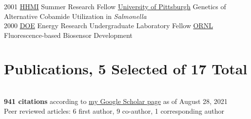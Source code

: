 \documentclass[letterpaper]{twentysecondcv3} %
\begin{document}
\begin{twenty}
    \twentyitem
   	{2001}
		{}
        {\href{https://www.hhmi.org/}{HHMI} Summer Research Fellow}
        {\href{https://www.pitt.edu/}{University of Pittsburgh}}
        {Genetics of Alternative Cobamide Utilization in \textit{Salmonella}}\\

    \twentyitem
        {2000}
		{}
        {\href{https://www.energy.gov/}{DOE} Energy Research Undergraduate Laboratory Fellow}
        {\href{https://www.ornl.gov/}{ORNL}}
        {Fluorescence-based Biosensor Development}

\end{twenty}

\section{Publications, 5 Selected of 17 Total}\\
\textbf{941 citations} according to \href{https://scholar.google.com/citations?user=bgdnUn8AAAAJ&hl=en}{my Google Scholar page} as of August 28, 2021\\
Peer reviewed articles: 6 first author, 9 co-author, 1 corresponding author

\nocite{Michalak2020, Gaby2017, Gaby2014, Gaby2012, Gaby2011}

%
%
%
%
\end{document}
